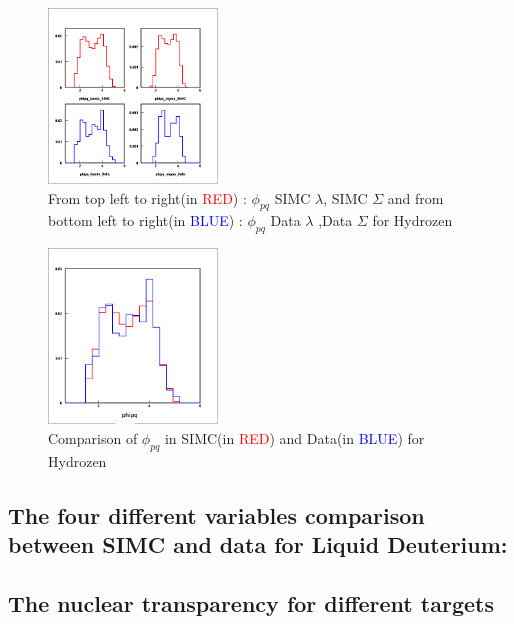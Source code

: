 \documentclass[aps,11pt]{revtex4}
\begin{document}
\begin{figure}[h]
	\centering
		\includegraphics[width=0.40\textwidth]{phipq_1.png}
	\caption{From top left to right(in \textcolor{red}{RED}) : $\phi_{pq}$ SIMC $\lambda$, SIMC $\Sigma$ and from bottom left to right(in \textcolor{blue}{BLUE}) : $\phi_{pq}$ Data $\lambda$  ,Data $\Sigma$ for Hydrozen}
	\label{fig:phipq_1}
\end{figure}
\begin{figure}[h]
	\centering
		\includegraphics[width=0.40\textwidth]{phipq_2.png}
	\caption{Comparison of $\phi_{pq}$ in SIMC(in \textcolor{red}{RED}) and Data(in \textcolor{blue}{BLUE}) for Hydrozen}
	\label{fig:phipq_2}
\end{figure}

\newpage
\subsection{The four different variables comparison between SIMC and data for Liquid Deuterium:}
\label{sec:The four different variables comparison between SIMC and data for Liquid Deuterium:}

\newpage
\subsection{The nuclear transparency for different targets}
\label{sec:The nuclear transparency for different targets}
\end{document}
